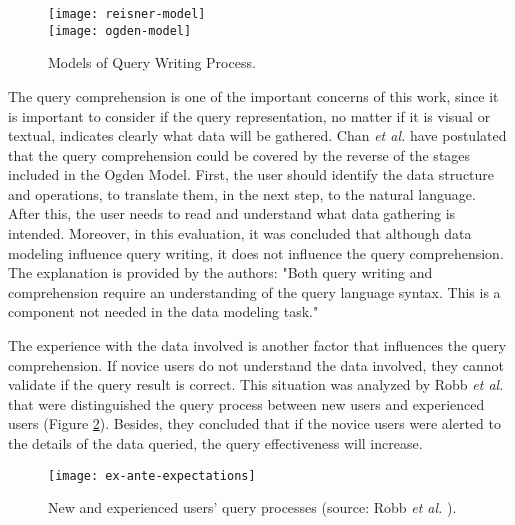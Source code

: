 \begin{figure}[tb]
  \centering
    {\texttt{[image: reisner-model]}}%
    \\
    {\texttt{[image: ogden-model]}}%
\caption{Models of Query Writing Process.}
  \label{fig:models_of_query_writing_process}
\end{figure}

The query comprehension is one of the important concerns of this work, since it is important to consider if the query representation, no matter if it is visual or textual, indicates clearly what data will be gathered. %
Chan \textit{et al.} \cite{anEvaluationOfNoviceEndUserComputingPerformance} have postulated that the query comprehension could be covered by the reverse of the stages included in the Ogden Model. First, the user should identify the data structure and operations, to translate them, in the next step, to the natural language. After this, the user needs to read and understand what data gathering is intended. Moreover, in this evaluation, it was concluded that although data modeling influence query writing, it does not influence the query comprehension. The explanation is provided by the authors: "Both query writing and comprehension require an understanding of the query language syntax. This is a component not needed in the data modeling task."

The experience with the data involved is another factor that influences the query comprehension. If novice users do not understand the data involved, they cannot validate if the query result is correct. This situation was analyzed by Robb \textit{et al.} \cite{improvingNewUsersQueryPerformance} that were distinguished the query process between new users and experienced users (Figure \ref{fig:ex_ante_expectations}). Besides, they concluded that if the novice users were alerted to the details of the data queried, the query effectiveness will increase.

\begin{figure}[tb]
  \centering
    {\texttt{[image: ex-ante-expectations]}}%
\caption{New and experienced users’ query processes (source: Robb \textit{et al.} \cite{improvingNewUsersQueryPerformance}).}
  \label{fig:ex_ante_expectations}
\end{figure}



